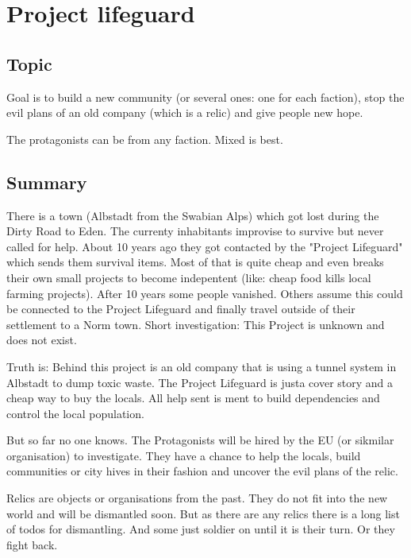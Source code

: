 \chapter{Project lifeguard}
\label{ch:project lifeguard}

\section{Topic}

Goal is to build a new community (or several ones: one for each faction), stop the evil plans of an old company (which is a relic) and give people new hope.

The protagonists can be from any faction. Mixed is best.

\section{Summary}

There is a town (Albstadt from the Swabian Alps) which got lost during the Dirty Road to Eden. The currenty inhabitants improvise to survive but never called for help. About 10 years ago they got contacted by the "Project Lifeguard" which sends them survival items. Most of that is quite cheap and even breaks their own small projects to become indepentent (like: cheap food kills local farming projects). After 10 years some people vanished. Others assume this could be connected to the Project Lifeguard and finally travel outside of their settlement to a Norm town. Short investigation: This Project is unknown and does not exist.

Truth is: Behind this project is an old company that is using a tunnel system in Albstadt to dump toxic waste. The Project Lifeguard is justa  cover story and a cheap way to buy the locals. All help sent is ment to build dependencies and control the local population.

But so far no one knows. The Protagonists will be hired by the EU (or sikmilar organisation) to investigate. They have a chance to help the locals, build communities or city hives in their fashion and uncover the evil plans of the relic.

\begin{sidebarBox}[title=Relics]
Relics are objects or organisations from the past. They do not fit into the new world and will be dismantled soon. But as there are any relics there is a long list of todos for dismantling. And some just soldier on until it is their turn. Or they fight back.
\end{sidebarBox}

